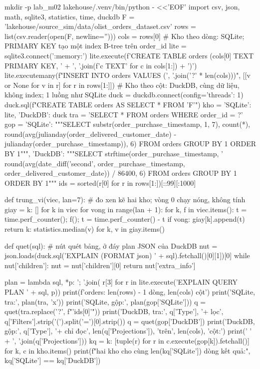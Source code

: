 \begin{codeblock}
mkdir -p lab_m02
lakehouse/.venv/bin/python - <<'EOF'
import csv, json, math, sqlite3, statistics, time, duckdb
F = 'lakehouse/source_sim/data/olist_orders_dataset.csv'
rows = list(csv.reader(open(F, newline='')))
cols = rows[0]
# Kho theo dòng: SQLite; PRIMARY KEY tạo một index B-tree trên order_id
lite = sqlite3.connect(':memory:')
lite.execute(f'CREATE TABLE orders ({cols[0]} TEXT PRIMARY KEY, '
             + ', '.join(f'{c} TEXT' for c in cols[1:]) + ')')
lite.executemany(f"INSERT INTO orders VALUES ({', '.join('?' * len(cols))})",
                 [[v or None for v in r] for r in rows[1:]])
# Kho theo cột: DuckDB, cùng dữ liệu, không index; 1 luồng như SQLite
duck = duckdb.connect(config={'threads': 1})
duck.sql(f"CREATE TABLE orders AS SELECT * FROM '{F}'")
kho = {'SQLite': lite, 'DuckDB': duck}
tra = 'SELECT * FROM orders WHERE order_id = ?'
gop = {'SQLite': """SELECT substr(order_purchase_timestamp, 1, 7), count(*),
         round(avg(julianday(order_delivered_customer_date)
                   - julianday(order_purchase_timestamp)), 6)
       FROM orders GROUP BY 1 ORDER BY 1""",
       'DuckDB': """SELECT strftime(order_purchase_timestamp, '%
         round(avg(date_diff('second', order_purchase_timestamp,
                             order_delivered_customer_date)) / 86400, 6)
       FROM orders GROUP BY 1 ORDER BY 1"""}
ids = sorted(r[0] for r in rows[1:])[::99][:1000]

def trung_vi(viec, lan=7):  # đo xen kẽ hai kho; vòng 0 chạy nóng, không tính
    giay = {k: [] for k in viec}
    for vong in range(lan + 1):
        for k, f in viec.items():
            t = time.perf_counter(); f(); t = time.perf_counter() - t
            if vong: giay[k].append(t)
    return {k: statistics.median(v) for k, v in giay.items()}

def quet(sql):  # nút quét bảng, ở đáy plan JSON của DuckDB
    nut = json.loads(duck.sql('EXPLAIN (FORMAT json) ' + sql).fetchall()[0][1])[0]
    while nut['children']:
        nut = nut['children'][0]
    return nut['extra_info']

plan = lambda sql, *p: '; '.join(
    r[3] for r in lite.execute('EXPLAIN QUERY PLAN ' + sql, p))
print(f'orders: {len(rows) - 1} dòng, {len(cols)} cột')
print('SQLite, tra:', plan(tra, 'x'))
print('SQLite, gộp:', plan(gop['SQLite']))
q = quet(tra.replace('?', f"'{ids[0]}'"))
print('DuckDB, tra:', q['Type'], '+ lọc',
      q['Filters'].strip('(').split('=')[0].strip())
q = quet(gop['DuckDB'])
print('DuckDB, gộp:', q['Type'], '+ chỉ đọc', len(q['Projections']), 'trên',
      len(cols), 'cột:')
print('  ' + ', '.join(q['Projections']))
kq = {k: [tuple(r) for r in c.execute(gop[k]).fetchall()] for k, c in kho.items()}
print(f"hai kho cho cùng {len(kq['SQLite'])} dòng kết quả:",
      kq['SQLite'] == kq['DuckDB'])


\end{codeblock}
